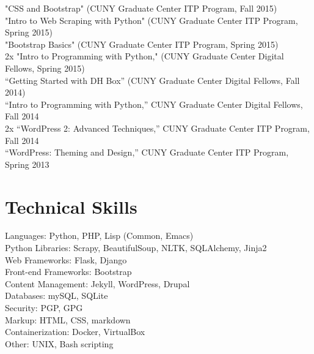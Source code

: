 \documentclass[11pt]{article}
\begin{document}
"CSS and Bootstrap" (CUNY Graduate Center ITP Program, Fall 2015)\\
"Intro to Web Scraping with Python" (CUNY Graduate Center ITP Program, Spring 2015)\\
"Bootstrap Basics" (CUNY Graduate Center ITP Program, Spring 2015)\\
2x "Intro to Programming with Python," (CUNY Graduate Center Digital Fellows, Spring 2015)\\
“Getting Started with DH Box” (CUNY Graduate Center Digital Fellows, Fall 2014)\\
“Intro to Programming with Python,” CUNY Graduate Center Digital Fellows, Fall 2014\\
2x “WordPress 2: Advanced Techniques,” CUNY Graduate Center ITP Program, Fall 2014\\
“WordPress: Theming and Design,” CUNY Graduate Center ITP Program, Spring 2013\\

\section*{Technical Skills}
\label{sec:orgheadline12}

Languages: Python, PHP, Lisp (Common, Emacs)\\
Python Libraries: Scrapy, BeautifulSoup, NLTK, SQLAlchemy, Jinja2\\
Web Frameworks: Flask, Django\\
Front-end Frameworks: Bootstrap\\
Content Management: Jekyll, WordPress, Drupal\\
Databases: mySQL, SQLite\\
Security: PGP, GPG\\
Markup: HTML, CSS, markdown\\
Containerization: Docker, VirtualBox\\
Other: UNIX, Bash scripting\\
\end{document}
